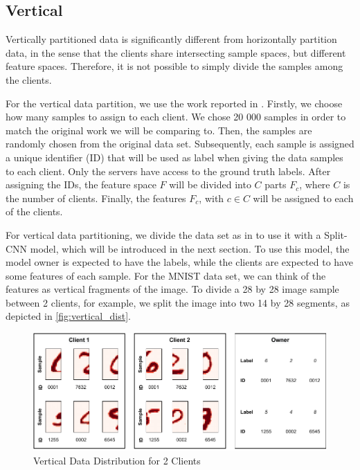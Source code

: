 \subsection{Vertical}\label{subsection:verticalpartitioning}

Vertically partitioned data is significantly different from horizontally partition data, in the sense that the clients share intersecting sample spaces, but different feature spaces. Therefore, it is not possible to simply divide the samples among the clients.

For the vertical data partition, we use the work reported in \cite{10.48550/arxiv.2104.00489}. Firstly, we choose how many samples to assign to each client. We chose 20 000 samples in order to match the original work \cite{10.48550/arxiv.2104.00489} we will be comparing to. Then, the samples are randomly chosen from the original data set. Subsequently, each sample is assigned a unique identifier (ID) that will be used as label when giving the data samples to each client. Only the servers have access to the ground truth labels. After assigning the IDs, the feature space $F$ will be divided into $C$ parts $F_c$, where $C$ is the number of clients. Finally, the features $F_c$, with $c \in C$ will be assigned to each of the clients.

For vertical data partitioning, we divide the data set as in \cite{10.48550/arxiv.2104.00489} to use it with a Split-CNN \cite{10.1145/3297858.3304038} model, which will be introduced in the next section. To use this model, the model owner is expected to have the labels, while the clients are expected to have some features of each sample. For the MNIST data set, we can think of the features as vertical fragments of the image. To divide a 28 by 28 image sample between 2 clients, for example, we split the image into two 14 by 28 segments, as depicted in \autoref{fig:vertical_dist}.

\begin{figure}[!ht]
    \centering
    \centering
    \includegraphics[width=1\textwidth]{graphics/vertical_partitioning.pdf}
    \caption{Vertical Data Distribution for 2 Clients}
    \label{fig:vertical_dist}
\end{figure}

